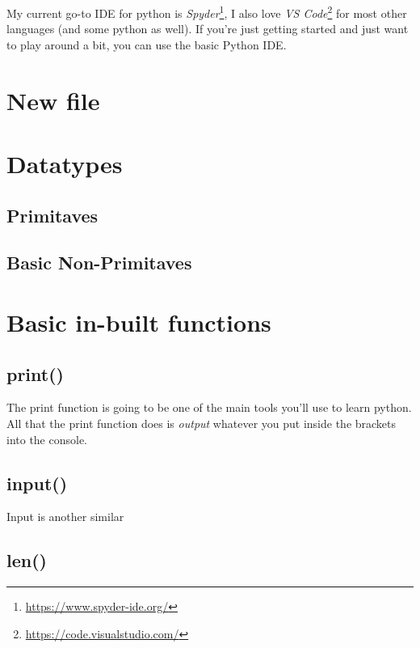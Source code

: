 \documentclass[12pt,a4paper]{book}
\begin{document}
			My current go-to IDE for python is \textit{Spyder}\footnote{\url{https://www.spyder-ide.org/}}, I also love \textit{VS Code}\footnote{\url{https://code.visualstudio.com/}} for most other languages (and some python as well). If you're just getting started and just want to play around a bit, you can use the basic Python IDE.
		\section{New file}
		\section{Datatypes}
			\subsection{Primitaves} 
			\subsection{Basic Non-Primitaves} 

		\section{Basic in-built functions} 
			\subsection{print()}
				The print function is going to be one of the main tools you'll use to learn python. All that the print function does is \textit{output} whatever you put inside the brackets into the console. 


			\subsection{input()}
				Input is another similar
				\vspace{7cm}

			\subsection{len()}
				\vspace{7cm}
\end{document}

